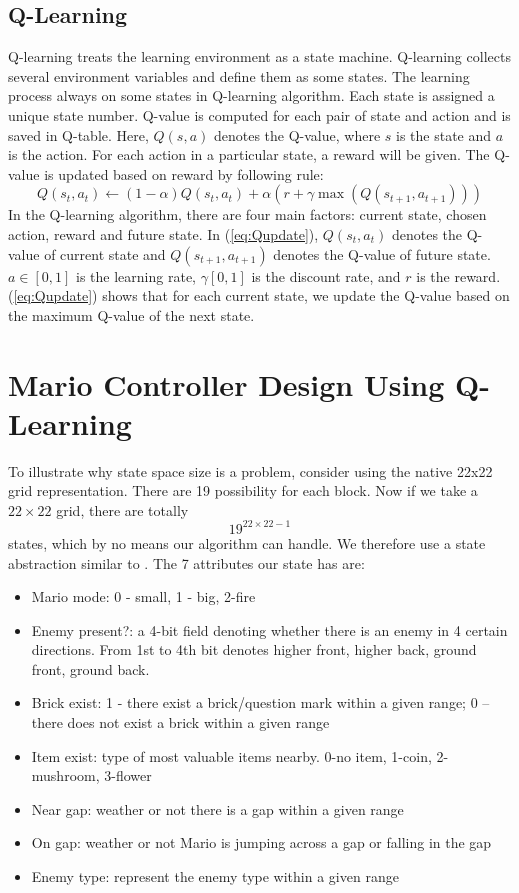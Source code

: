 \subsection{Q-Learning}
Q-learning treats the learning environment as a state machine. Q-learning collects several environment variables and define them as some states. The learning process always on some states in Q-learning algorithm. Each state is assigned a unique state number. Q-value is computed for each pair of state and action and is saved in Q-table. Here, $Q(s,a)$ denotes the Q-value, where $s$ is the state and $a$ is the action. For each action in a particular state, a reward will be given. The Q-value is updated based on reward by following rule:
\begin{equation}
\label{eq:Qupdate}
Q(s_t,a_t) \leftarrow (1-\alpha)Q(s_t,a_t) + \alpha(r+\gamma\max(Q(s_{t+1},a_{t+1})))
\end{equation}
In the Q-learning algorithm, there are four main factors: current state, chosen action, reward and future state. In (\ref{eq:Qupdate}), $Q(s_t,a_t)$ denotes the Q-value of current state and $Q(s_{t+1},a_{t+1})$ denotes the Q-value of future state. $a \in \left[0,1\right]$ is the learning rate, $\gamma \left[0,1\right]$ is the discount rate, and $r$ is the reward. (\ref{eq:Qupdate}) shows that for each current state, we update the Q-value based on the maximum Q-value of the next state.

\section{Mario Controller Design Using Q-Learning}
To illustrate why state space size is a problem, consider using the native 22x22 grid representation. There are 19 possibility for each block. Now if we take a $22\times 22$ grid, there are totally
\begin{equation}
19^{22\times 22 - 1}
\end{equation}
states, which by no means our algorithm can handle. We therefore use a state abstraction similar to \cite{tsay2011evolving}. The 7 attributes our state has are:

\begin{itemize}
\item Mario mode: 0 - small, 1 - big, 2-fire
\item Enemy present?: a 4-bit field denoting whether there is an enemy in 4 certain directions. From 1st to 4th bit denotes higher front, higher back, ground front, ground back.
\item Brick exist: 1 - there exist a brick/question mark within a given range; 0 -- there does not exist a brick within a given range
\item Item exist: type of most valuable items nearby. 0-no item, 1-coin, 2-mushroom, 3-flower
\item Near gap: weather or not there is a gap within a given range
\item On gap: weather or not Mario is jumping across a gap or falling in the gap
\item Enemy type: represent the enemy type within a given range
\end{itemize}

